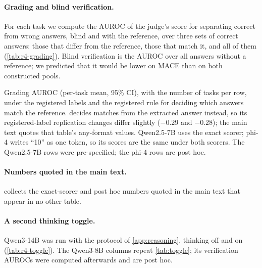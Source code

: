 \paragraph{Grading and blind verification.}
For each task we compute the AUROC of the judge's score for separating correct from wrong answers, blind and with the reference, over three sets of correct answers: those that differ from the reference, those that match it, and all of them (\cref{tab:r4-grading}). Blind verification is the AUROC over all answers without a reference; we predicted that it would be lower on \textsc{MACE} than on both constructed pools.\pre

\begin{table}[htbp]
\centering
\caption{Grading AUROC (per-task mean, 95\% CI), with the number of tasks per row, under the registered labels and the registered rule for deciding which answers match the reference.  decides matches from the extracted answer instead, so its registered-label replication changes differ slightly ($-0.29$ and $-0.28$); the main text quotes that table's any-format values. Qwen2.5-7B uses the exact scorer; phi-4 writes ``10'' as one token, so its scores are the same under both scorers. The Qwen2.5-7B rows were pre-specified; the phi-4 rows are post hoc.}
\label{tab:r4-grading}
\footnotesize
\setlength{\tabcolsep}{3pt}
\begin{adjustbox}{max width=\linewidth}\end{adjustbox}

\end{table}

\paragraph{Numbers quoted in the main text.}
 collects the exact-scorer and post hoc numbers quoted in the main text that appear in no other table.\ph

{\footnotesize\setlength{\tabcolsep}{4pt}}

\paragraph{A second thinking toggle.}
Qwen3-14B was run with the protocol of \cref{app:reasoning}, thinking off and on (\cref{tab:r4-toggle}). The Qwen3-8B columns repeat \cref{tab:toggle}; its verification AUROCs were computed afterwards and are post hoc.\pre

